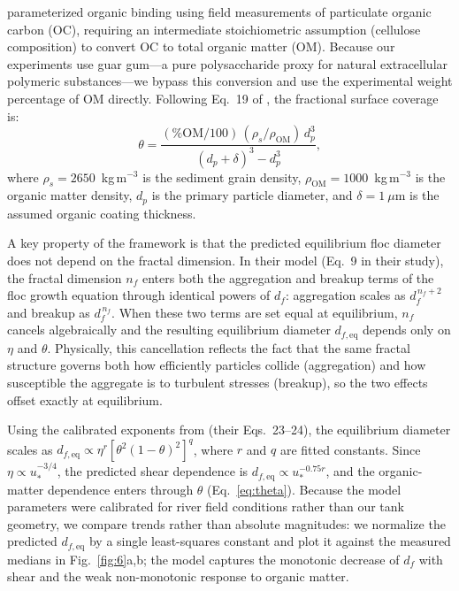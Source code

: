 \documentclass{agujournal2019}
\begin{document}
 parameterized organic binding using field measurements of particulate organic carbon (OC), requiring an intermediate stoichiometric assumption (cellulose composition) to convert OC to total organic matter (OM). Because our experiments use guar gum---a pure polysaccharide proxy for natural extracellular polymeric substances---we bypass this conversion and use the experimental weight percentage of OM directly. Following Eq.~19 of , the fractional surface coverage is:
\begin{equation}
    \theta = \frac{(\text{\%OM}/100)\,(\rho_s / \rho_{\text{OM}})\, d_p^3}{(d_p + \delta)^3 - d_p^3},
    \label{eq:theta}
\end{equation}
where $\rho_s = 2650$~kg\,m$^{-3}$ is the sediment grain density, $\rho_{\text{OM}} = 1000$~kg\,m$^{-3}$ is the organic matter density, $d_p$ is the primary particle diameter, and $\delta = 1~\mu$m is the assumed organic coating thickness.

A key property of the  framework is that the predicted equilibrium floc diameter does not depend on the fractal dimension. In their model (Eq.~9 in their study), the fractal dimension $n_f$ enters both the aggregation and breakup terms of the floc growth equation through identical powers of $d_f$: aggregation scales as $d_f^{\,n_f+2}$ and breakup as $d_f^{\,n_f}$. When these two terms are set equal at equilibrium, $n_f$ cancels algebraically and the resulting equilibrium diameter $d_{f,\text{eq}}$ depends only on $\eta$ and $\theta$. Physically, this cancellation reflects the fact that the same fractal structure governs both how efficiently particles collide (aggregation) and how susceptible the aggregate is to turbulent stresses (breakup), so the two effects offset exactly at equilibrium.

Using the calibrated exponents from  (their Eqs.~23--24), the equilibrium diameter scales as $d_{f,\text{eq}} \propto \eta^{r}[\theta^2(1-\theta)^2]^{q}$, where $r$ and $q$ are fitted constants. Since $\eta \propto u_*^{-3/4}$, the predicted shear dependence is $d_{f,\text{eq}} \propto u_*^{-0.75r}$, and the organic-matter dependence enters through $\theta$ (Eq.~\eqref{eq:theta}). Because the model parameters were calibrated for river field conditions rather than our tank geometry, we compare trends rather than absolute magnitudes: we normalize the predicted $d_{f,\text{eq}}$ by a single least-squares constant and plot it against the measured medians in Fig.~\ref{fig:6}a,b; the model captures the monotonic decrease of $d_f$ with shear and the weak non-monotonic response to organic matter.
\end{document}
